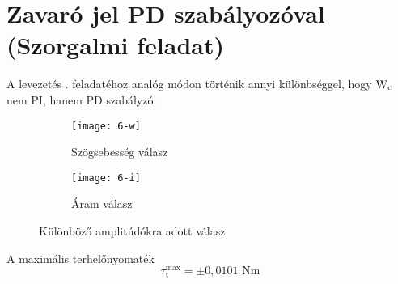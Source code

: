 \section{Zavaró jel PD szabályozóval (Szorgalmi feladat)}

A levezetés . feladatéhoz analóg módon történik annyi különbséggel, hogy
$\mathrm{W}_\text{c}$ nem PI, hanem PD szabályzó.

\begin{figure}[H]
	\centering
	\begin{subfigure}{.49\textwidth}
		\texttt{[image: 6-w]}
		\caption{Szögsebesség válasz}
	\end{subfigure}
	\begin{subfigure}{.49\textwidth}
		\texttt{[image: 6-i]}
		\caption{Áram válasz}
	\end{subfigure}
	\caption{Különböző amplitúdókra adott válasz}
	\label{fig:szorg2}
\end{figure}

A maximális terhelőnyomaték
\begin{equation}
	\tau_\text{t}^\text{max} = \pm0,0101\text{ Nm}
\end{equation}
